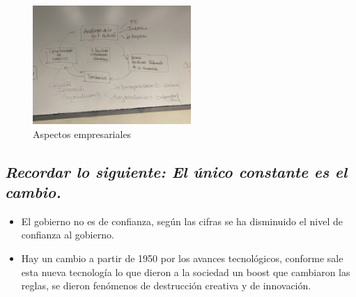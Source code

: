 \begin{figure}[htbp]
    \centering
    \includegraphics[width=6cm]{Clases/Images/2020-01-15-Empresarialidad.jpeg}
    \caption{Aspectos empresariales}
    \label{}
\end{figure} 
\subsection{\emph{\textbf{Recordar lo siguiente: }El único constante es el cambio.}}
\begin{itemize}
    \item El gobierno no es de confianza, según las cifras se ha disminuido el nivel de confianza al gobierno.
    \item Hay un cambio a partir de 1950 por los avances tecnológicos, conforme sale esta nueva tecnología lo que dieron a la sociedad un boost que cambiaron las reglas, se dieron fenómenos de destrucción creativa y de innovación.
\end{itemize}
